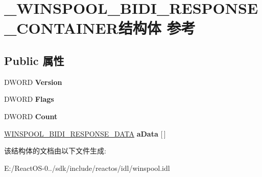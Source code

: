 \hypertarget{struct___w_i_n_s_p_o_o_l___b_i_d_i___r_e_s_p_o_n_s_e___c_o_n_t_a_i_n_e_r}{}\section{\+\_\+\+W\+I\+N\+S\+P\+O\+O\+L\+\_\+\+B\+I\+D\+I\+\_\+\+R\+E\+S\+P\+O\+N\+S\+E\+\_\+\+C\+O\+N\+T\+A\+I\+N\+E\+R结构体 参考}
\label{struct___w_i_n_s_p_o_o_l___b_i_d_i___r_e_s_p_o_n_s_e___c_o_n_t_a_i_n_e_r}
\subsection*{Public 属性}
\begin{DoxyCompactItemize}
\item 
\mbox{\label{struct___w_i_n_s_p_o_o_l___b_i_d_i___r_e_s_p_o_n_s_e___c_o_n_t_a_i_n_e_r_ad9618946c40b6857783067bad2c58474}} 
D\+W\+O\+RD {\bfseries Version}
\item 
\mbox{\label{struct___w_i_n_s_p_o_o_l___b_i_d_i___r_e_s_p_o_n_s_e___c_o_n_t_a_i_n_e_r_ae69b56d410542bc2c7679af849653cbb}} 
D\+W\+O\+RD {\bfseries Flags}
\item 
\mbox{\label{struct___w_i_n_s_p_o_o_l___b_i_d_i___r_e_s_p_o_n_s_e___c_o_n_t_a_i_n_e_r_a61d7c2b58aee65176e9cc99a933bd90e}} 
D\+W\+O\+RD {\bfseries Count}
\item 
\mbox{\label{struct___w_i_n_s_p_o_o_l___b_i_d_i___r_e_s_p_o_n_s_e___c_o_n_t_a_i_n_e_r_acb2ddf3763b098d3767ab8490c9cbc72}} 
\hyperlink{struct___w_i_n_s_p_o_o_l___b_i_d_i___r_e_s_p_o_n_s_e___d_a_t_a}{W\+I\+N\+S\+P\+O\+O\+L\+\_\+\+B\+I\+D\+I\+\_\+\+R\+E\+S\+P\+O\+N\+S\+E\+\_\+\+D\+A\+TA} {\bfseries a\+Data} \mbox{[}$\,$\mbox{]}
\end{DoxyCompactItemize}


该结构体的文档由以下文件生成\+:\begin{DoxyCompactItemize}
\item 
E\+:/\+React\+O\+S-\/0../sdk/include/reactos/idl/winspool.\+idl\end{DoxyCompactItemize}
